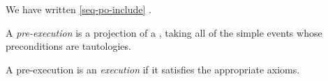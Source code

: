 We have written \ref{seq-po-include} .

\begin{definition}
  A \cXI{} \emph{pre-execution} is a projection of a \PwTc{}, taking all of
  the simple events whose preconditions are tautologies.

  A \cXI{} {pre-execution} is an \emph{execution} if it satisfies the
  appropriate axioms.
\end{definition}




